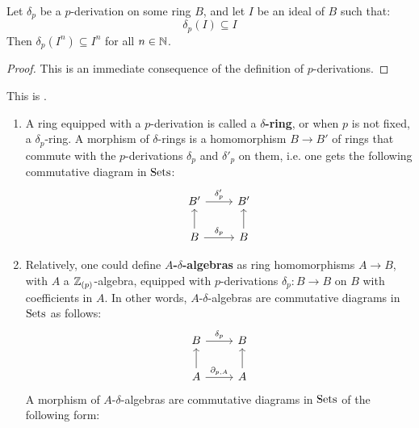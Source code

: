         \begin{proposition}
            Let $\delta_p$ be a $p$-derivation on some ring $B$, and let $I$ be an ideal of $B$ such that:
                $$\delta_p(I) \subseteq I$$
            Then $\delta_p(I^n) \subseteq I^n$ for all $n \in \mathbb{N}$. 
        \end{proposition}
            \begin{proof}
                This is an immediate consequence of the definition of $p$-derivations.
            \end{proof}
            
        \begin{definition} \label{def: delta_rings}
            This is \cite[Definition 2.1]{bhatt_scholze_prisms}.
            \begin{enumerate}
                \item A ring equipped with a $p$-derivation is called a \textbf{$\delta$-ring}, or when $p$ is not fixed, a $\delta_p$-ring. A morphism of $\delta$-rings is a homomorphism $B \to B'$ of rings that commute with the $p$-derivations $\delta_p$ and $\delta'_p$ on them, i.e. one gets the following commutative diagram in $\Sets$:
                    $$
                        \begin{tikzcd}
                            B' \arrow[r, "\delta_p'"]         & B'          \\
                            B \arrow[u] \arrow[r, "\delta_p"] & B \arrow[u]
                        \end{tikzcd}
                    $$
                \item Relatively, one could define \textbf{$A$-$\delta$-algebras} as ring homomorphisms $A \to B$, with $A$ a $\Z_{(p)}$-algebra, equipped with $p$-derivations $\delta_p: B \to B$ on $B$ with coefficients in $A$. In other words, $A$-$\delta$-algebras are commutative diagrams in $\Sets$ as follows:
                    $$
                        \begin{tikzcd}
                            B \arrow[r, "\delta_p"]               & B           \\
                            A \arrow[u] \arrow[r, "{\del_{p,A}}"] & A \arrow[u]
                        \end{tikzcd}
                    $$
                A morphism of $A$-$\delta$-algebras are commutative diagrams in $\Sets$ of the following form:
                    $$
                        \begin{tikzcd}

\end{tikzcd}$$
\end{enumerate}
\end{definition}
